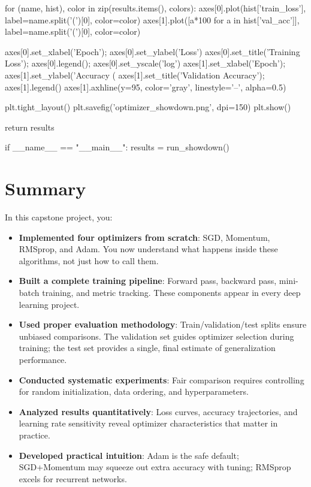 \documentclass[../../main.tex]{subfiles}
\begin{document}
\begin{pythoncode}
    for (name, hist), color in zip(results.items(), colors):
        axes[0].plot(hist['train_loss'], label=name.split('(')[0], color=color)
        axes[1].plot([a*100 for a in hist['val_acc']], label=name.split('(')[0],
                    color=color)

    axes[0].set_xlabel('Epoch'); axes[0].set_ylabel('Loss')
    axes[0].set_title('Training Loss'); axes[0].legend(); axes[0].set_yscale('log')
    axes[1].set_xlabel('Epoch'); axes[1].set_ylabel('Accuracy (%
    axes[1].set_title('Validation Accuracy'); axes[1].legend()
    axes[1].axhline(y=95, color='gray', linestyle='--', alpha=0.5)

    plt.tight_layout()
    plt.savefig('optimizer_showdown.png', dpi=150)
    plt.show()

    return results


if __name__ == "__main__":
    results = run_showdown()
\end{pythoncode}

\section{Summary}
\label{sec:capstone-summary}

In this capstone project, you:

\begin{itemize}
    \item \textbf{Implemented four optimizers from scratch}: SGD, Momentum, RMSprop, and Adam. You now understand what happens inside these algorithms, not just how to call them.

    \item \textbf{Built a complete training pipeline}: Forward pass, backward pass, mini-batch training, and metric tracking. These components appear in every deep learning project.

    \item \textbf{Used proper evaluation methodology}: Train/validation/test splits ensure unbiased comparisons. The validation set guides optimizer selection during training; the test set provides a single, final estimate of generalization performance.

    \item \textbf{Conducted systematic experiments}: Fair comparison requires controlling for random initialization, data ordering, and hyperparameters.

    \item \textbf{Analyzed results quantitatively}: Loss curves, accuracy trajectories, and learning rate sensitivity reveal optimizer characteristics that matter in practice.

    \item \textbf{Developed practical intuition}: Adam is the safe default; SGD+Momentum may squeeze out extra accuracy with tuning; RMSprop excels for recurrent networks.
\end{itemize}
\end{document}
